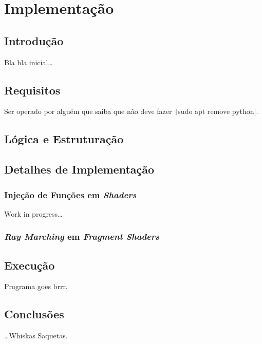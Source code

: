 \chapter{Implementação}
\label{ch::impl}

\section{Introdução}
\label{sec::impl:intro}

Bla bla inicial\ldots


\section{Requisitos}
\label{sec::impl:requisitos}

Ser operado por alguém que saiba que não deve fazer \texttt|sudo apt remove python|.



\section{Lógica e Estruturação}
\label{sec::impl:estrutura}



\section{Detalhes de Implementação}
\label{sec::impl:detalhes}

\subsection{Injeção de Funções em \emph{Shaders}}
\label{ssec::impl:detalhes:shaders}

Work in progress\ldots

\subsection{\emph{Ray Marching} em \emph{Fragment Shaders}}
\label{ssec::impl:detalhes:raymarch}



\section{Execução}
\label{sec::impl:exec}

Programa goes brrr.


\section{Conclusões}
\label{sec::impl:conc}

\ldots Whiskas Saquetas.
